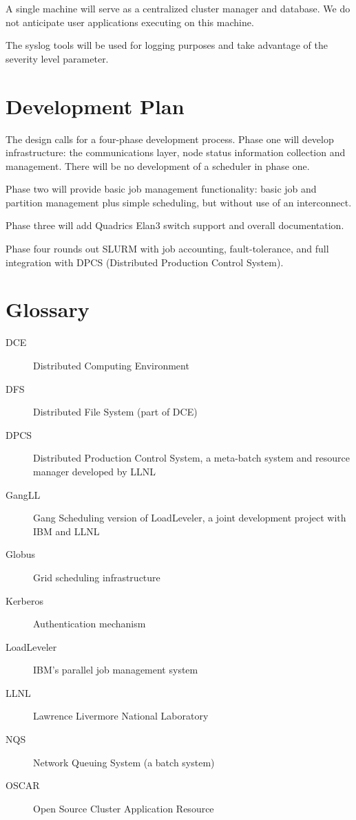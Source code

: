 A single machine will serve as a centralized cluster manager and database. We
do not anticipate user applications executing on this machine. 

The syslog tools will be used for logging purposes and take advantage of the 
severity level parameter.

\section{Development Plan}

The design calls for a four-phase development process.  Phase one will
develop infrastructure: the communications layer, node status information 
collection and management.  There will be no development of a scheduler 
in phase one.

Phase two will provide basic job management functionality:  basic job and 
partition management plus simple scheduling, but without use of an
interconnect. 

Phase three will add Quadrics Elan3 switch support and overall documentation.  

Phase four rounds out SLURM with job accounting, fault-tolerance, 
and full integration with DPCS (Distributed Production Control System).

\appendix
\newpage

\section{Glossary}

\begin{description}
\item[DCE]	Distributed Computing Environment
\item[DFS]	Distributed File System (part of DCE)
\item[DPCS]	Distributed Production Control System, a meta-batch system 
		and resource manager developed by LLNL
\item[GangLL]	Gang Scheduling version of LoadLeveler, a joint development 
		project with IBM and LLNL
\item[Globus]	Grid scheduling infrastructure
\item[Kerberos]	Authentication mechanism
\item[LoadLeveler] IBM's parallel job management system
\item[LLNL]	Lawrence Livermore National Laboratory
\item[NQS]	Network Queuing System (a batch system)
\item[OSCAR]	Open Source Cluster Application Resource
\end{description}

\newpage


